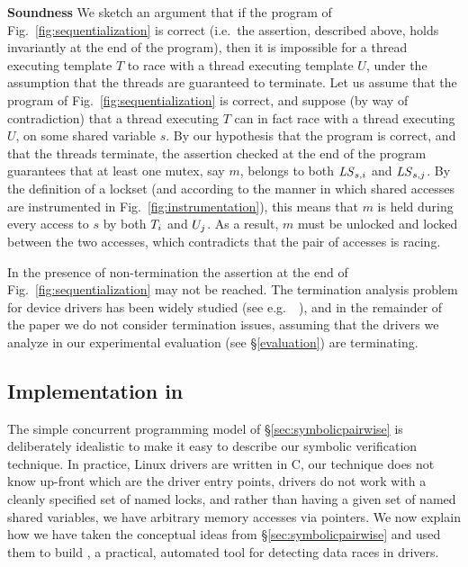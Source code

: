 \noindent\textbf{Soundness }
%
We sketch an argument that if the program of Fig.~\ref{fig:sequentialization} is correct (i.e.\ the assertion, described above, holds invariantly at the end of the program), then it is impossible for a thread executing template $T$ to race with a thread executing template $U$, under the assumption that the threads are guaranteed to terminate. Let us assume that the program of Fig.~\ref{fig:sequentialization} is correct, and suppose (by way of contradiction) that a thread executing $T$ can in fact race with a thread executing $U$, on some shared variable $s$.  By our hypothesis that the program is correct, and that the threads terminate, the assertion checked at the end of the program guarantees that at least one mutex, say $m$, belongs to both $\mathit{LS}_{s,i}$ and $\mathit{LS}_{s,j}$.  By the definition of a lockset (and according to the manner in which shared accesses are instrumented in Fig.~\ref{fig:instrumentation}), this means that $m$ is held during every access to $s$ by both $T_{i}$ and $U_{j}$. As a result, $m$ must be unlocked and locked between the two accesses, which contradicts that the pair of accesses is racing.

In the presence of non-termination the assertion at the end of Fig.~\ref{fig:sequentialization} may not be reached.  The termination analysis problem for device drivers has been widely studied (see e.g.\ ~\cite{cook2006termination}), and in the remainder of the paper we do not consider termination issues, assuming that the drivers we analyze in our experimental evaluation (see \S\ref{evaluation}) are terminating.

\subsection{Implementation in \whoop}
\label{sec:implementation}

The simple concurrent programming model of \S\ref{sec:symbolicpairwise} is deliberately idealistic to make it easy to describe our symbolic verification technique. In practice, Linux drivers are written in C, our technique does not know up-front which are the driver entry points, drivers do not work with a cleanly specified set of named locks, and rather than having a given set of named shared variables, we have arbitrary memory accesses via pointers. We now explain how we have taken the conceptual ideas from \S\ref{sec:symbolicpairwise} and used them to build \whoop, a practical, automated tool for detecting data races in drivers.

